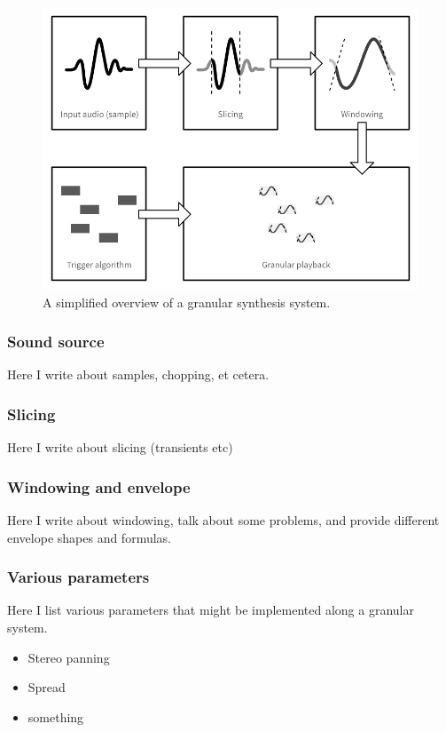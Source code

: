 \documentclass[10pt, twocolumn]{IEEEtran}
\begin{document}
\begin{figure}[h!]
	\includegraphics[width=\linewidth]{GranularDiagram.png}
	\caption{A simplified overview of a granular synthesis system.}
	\label{fig:block_diagram}
\end{figure}

\subsubsection{Sound source}
Here I write about samples, chopping, et cetera.
\subsubsection{Slicing}
Here I write about slicing (transients etc)
\subsubsection{Windowing and envelope}
Here I write about windowing, talk about some problems, and provide different envelope shapes and formulas.
\subsubsection{Various parameters}
Here I list various parameters that might be implemented along a granular system.
\begin{itemize}
\item{Stereo panning}
\item{Spread}
\item{something}
\end{itemize}
\end{document}
